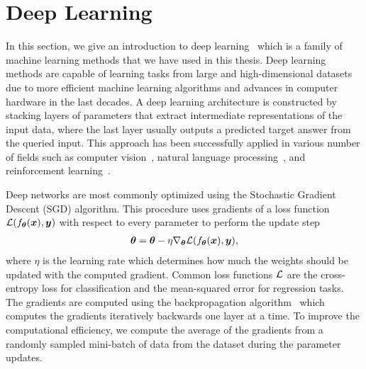 \section{Deep Learning}\label{sec:deep_learning}

In this section, we give an introduction to deep learning~\cite{goodfellow2016deep} which is a family of machine learning methods that we have used in this thesis. 
Deep learning methods are capable of learning tasks from large and high-dimensional datasets due to more efficient machine learning algorithms and advances in computer hardware in the last decades. A deep learning architecture is constructed by stacking layers of parameters that extract intermediate representations of the input data, where the last layer usually outputs a predicted target answer from the queried input. This approach has been successfully applied in various number of fields such as computer vision~\cite{he2016deep, krizhevsky2012imagenet}, natural language processing~\cite{devlin2018bert}, and reinforcement learning~\cite{mnih2015human, silver2016mastering}. 

Deep networks are most commonly optimized using the Stochastic Gradient Descent (SGD) algorithm. This procedure uses gradients of a loss function ${\mathcal{L}}(f_{{\bm{\theta}}}({\bm{x}}), {\bm{y}})$ with respect to every parameter to perform the update step
\begin{align}\label{eq:weight_update_sgd}
	{\bm{\theta}} = {\bm{\theta}} - \eta \nabla_{{\bm{\theta}}} {\mathcal{L}}(f_{{\bm{\theta}}}({\bm{x}}), {\bm{y}}),
\end{align} 
where $\eta$ is the learning rate which determines how much the weights should be updated with the computed gradient. Common loss functions ${\mathcal{L}}$ are the cross-entropy loss for classification and the mean-squared error for regression tasks. The gradients are computed using the backpropagation algorithm~\cite{rumelhart1986learning} which computes the gradients iteratively backwards one layer at a time. To improve the computational efficiency, we compute the average of the gradients from a randomly sampled mini-batch of data from the dataset during the parameter updates.

